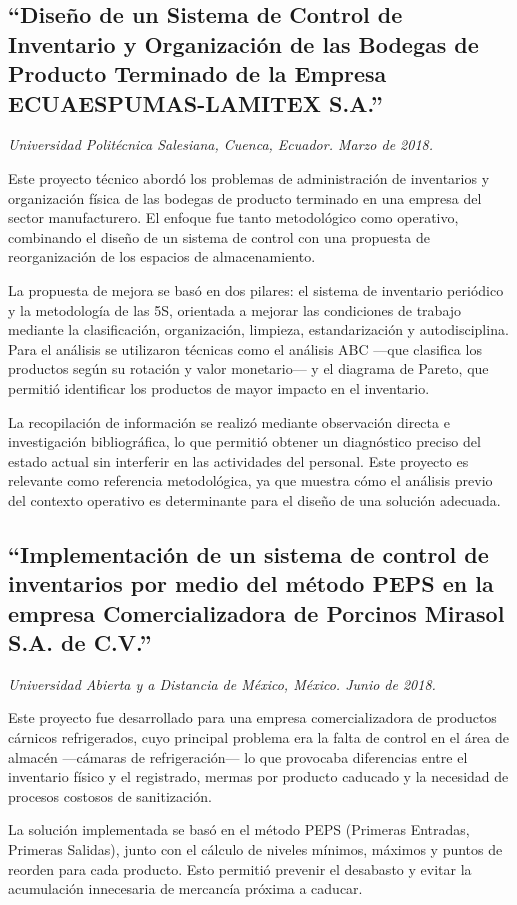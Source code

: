 \subsection{``Diseño de un Sistema de Control de Inventario y Organización de las Bodegas de Producto Terminado de la Empresa ECUAESPUMAS-LAMITEX S.A.''}
\textit{Universidad Politécnica Salesiana, Cuenca, Ecuador. Marzo de 2018.}

Este proyecto técnico abordó los problemas de administración de inventarios y organización física de las bodegas de producto terminado en una empresa del sector manufacturero. El enfoque fue tanto metodológico como operativo, combinando el diseño de un sistema de control con una propuesta de reorganización de los espacios de almacenamiento.

La propuesta de mejora se basó en dos pilares: el sistema de inventario periódico y la metodología de las 5S, orientada a mejorar las condiciones de trabajo mediante la clasificación, organización, limpieza, estandarización y autodisciplina. Para el análisis se utilizaron técnicas como el análisis ABC ---que clasifica los productos según su rotación y valor monetario--- y el diagrama de Pareto, que permitió identificar los productos de mayor impacto en el inventario.

La recopilación de información se realizó mediante observación directa e investigación bibliográfica, lo que permitió obtener un diagnóstico preciso del estado actual sin interferir en las actividades del personal. Este proyecto es relevante como referencia metodológica, ya que muestra cómo el análisis previo del contexto operativo es determinante para el diseño de una solución adecuada.


\subsection{``Implementación de un sistema de control de inventarios por medio del método PEPS en la empresa Comercializadora de Porcinos Mirasol S.A. de C.V.''}
\textit{Universidad Abierta y a Distancia de México, México. Junio de 2018.}

Este proyecto fue desarrollado para una empresa comercializadora de productos cárnicos refrigerados, cuyo principal problema era la falta de control en el área de almacén ---cámaras de refrigeración--- lo que provocaba diferencias entre el inventario físico y el registrado, mermas por producto caducado y la necesidad de procesos costosos de sanitización.

La solución implementada se basó en el método PEPS (Primeras Entradas, Primeras Salidas), junto con el cálculo de niveles mínimos, máximos y puntos de reorden para cada producto. Esto permitió prevenir el desabasto y evitar la acumulación innecesaria de mercancía próxima a caducar.


